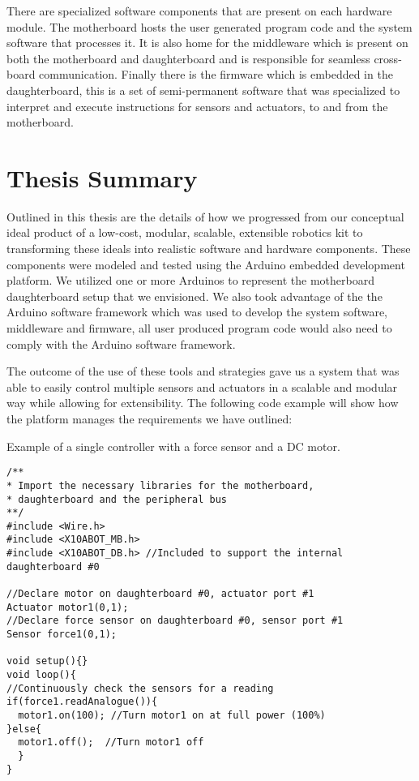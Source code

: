 There are specialized software components that are present on each hardware module. The motherboard hosts the user generated program code and the system software that processes it. It is also home for the middleware which is present on both the motherboard and daughterboard and is responsible for seamless cross-board communication. Finally there is the firmware which is embedded in the daughterboard, this is a set of semi-permanent software that was specialized to interpret and execute instructions for sensors and actuators, to and from the motherboard.

\section{Thesis Summary}
Outlined in this thesis are the details of how we progressed from our conceptual ideal product of a low-cost, modular, scalable, extensible robotics kit to transforming these ideals into realistic software and hardware components. These components were modeled and tested using the Arduino embedded development platform. We utilized one or more Arduinos to represent the motherboard daughterboard setup that we envisioned. We also took advantage of the the Arduino software framework which was used to develop the system software, middleware and firmware, all user produced program code would also need to comply with the Arduino software framework.

The outcome of the use of these tools and strategies gave us a system that was able to easily control multiple sensors and actuators in a scalable and modular way while allowing for extensibility.
The following code example will show how the \xten platform manages the requirements we have outlined:

\begin{listing}
		\footnotesize
		\caption{Example of a single controller with a force sensor and a DC motor.} \label{code:simpl}
		\begin{verbatim}
/**
* Import the necessary libraries for the motherboard, 
* daughterboard and the peripheral bus
**/
#include <Wire.h>  
#include <X10ABOT_MB.h>
#include <X10ABOT_DB.h> //Included to support the internal daughterboard #0

//Declare motor on daughterboard #0, actuator port #1
Actuator motor1(0,1);
//Declare force sensor on daughterboard #0, sensor port #1
Sensor force1(0,1);

void setup(){}
void loop(){
//Continuously check the sensors for a reading
if(force1.readAnalogue()){
  motor1.on(100); //Turn motor1 on at full power (100%) 
}else{
  motor1.off();  //Turn motor1 off
  }
}	 
	\end{verbatim}
		
\end{listing}


